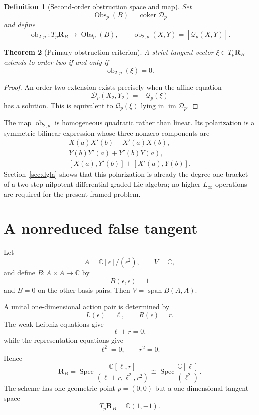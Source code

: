 \documentclass[11pt]{amsart}
\newtheorem{theorem}{Theorem}[section]
\newtheorem{definition}[theorem]{Definition}
\newcommand{\Span}{\operatorname{span}}
\newcommand{\Spec}{\operatorname{Spec}}
\newcommand{\coker}{\operatorname{coker}}
\newcommand{\Obs}{\operatorname{Obs}}
\newcommand{\cD}{\mathscr D}
\newcommand{\cQ}{\mathscr Q}
\newcommand{\C}{\mathbb C}
\begin{document}
\begin{definition}[Second-order obstruction space and map]
Set
\[
\Obs_p(B)=\coker\cD_p
\]
and define
\[
\operatorname{ob}_{2,p}:T_p\mathbf R_B\longrightarrow\Obs_p(B),
\qquad
\operatorname{ob}_{2,p}(X,Y)=[\cQ_p(X,Y)].
\]
\end{definition}

\begin{theorem}[Primary obstruction criterion]\label{thm:obstruction}
A strict tangent vector $\xi\in T_p\mathbf R_B$ extends to order two if and only if
\[
\operatorname{ob}_{2,p}(\xi)=0.
\]
\end{theorem}

\begin{proof}
An order-two extension exists precisely when the affine equation
\[
\cD_p(X_2,Y_2)=-\cQ_p(\xi)
\]
has a solution.  This is equivalent to $\cQ_p(\xi)$ lying in $\operatorname{im}\cD_p$.
\end{proof}

The map $\operatorname{ob}_{2,p}$ is homogeneous quadratic rather than linear.  Its polarization is a symmetric bilinear expression whose three nonzero components are
\begin{align*}
X(a)X'(b)+X'(a)X(b),\\
Y(b)Y'(a)+Y'(b)Y(a),\\
[X(a),Y'(b)]+[X'(a),Y(b)].
\end{align*}
Section~\ref{sec:dgla} shows that this polarization is already the degree-one bracket of a two-step nilpotent differential graded Lie algebra; no higher $L_\infty$ operations are required for the present framed problem.

\section{A nonreduced false tangent}\label{sec:false-tangent}

Let
\[
A=\C[\epsilon]/(\epsilon^2),
\qquad
V=\C,
\]
and define $B:A\times A\to\C$ by
\[
B(\epsilon,\epsilon)=1
\]
and $B=0$ on the other basis pairs.  Then $V=\Span B(A,A)$.

A unital one-dimensional action pair is determined by
\[
L(\epsilon)=\ell,
\qquad
R(\epsilon)=r.
\]
The weak Leibniz equations give
\[
\ell+r=0,
\]
while the representation equations give
\[
\ell^2=0,
\qquad
r^2=0.
\]
Hence
\[
\mathbf R_B
=\Spec\frac{\C[\ell,r]}{(\ell+r,\ell^2,r^2)}
\cong
\Spec\frac{\C[\ell]}{(\ell^2)}.
\]
The scheme has one geometric point $p=(0,0)$ but a one-dimensional tangent space
\[
T_p\mathbf R_B=\C(1,-1).
\]
\end{document}

